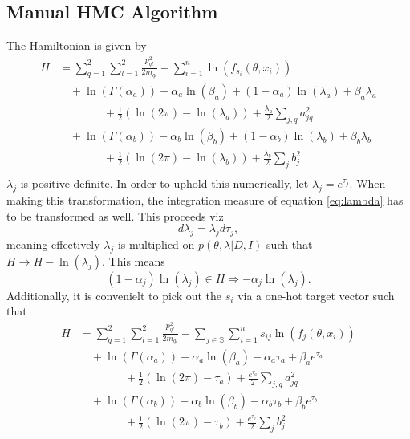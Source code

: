 \begin{example}
	\subsection{Manual HMC Algorithm}
	The Hamiltonian is given by
	\begin{equation}
		\begin{split}
			H&=\sum_{q=1}^{2}\sum_{l=1}^{2}\frac{p_{ql}^2}{2m_{ql}}-\sum_{i=1}^{n}\ln(f_{s_i}(\theta,x_i))\\
			&\quad+\ln(\Gamma(\alpha_a))-\alpha_a\ln(\beta_a)+(1-\alpha_a)\ln(\lambda_a)+\beta_a\lambda_a\\
			&\qquad \qquad+\frac{1}{2}(\ln(2\pi)-\ln(\lambda_a))+\frac{\lambda_a}{2}\sum_{j,q}a_{jq}^2\\
			&\quad+\ln(\Gamma(\alpha_b))-\alpha_b\ln(\beta_b)+(1-\alpha_b)\ln(\lambda_b)+\beta_b\lambda_b\\
			&\qquad \qquad+\frac{1}{2}(\ln(2\pi)-\ln(\lambda_b))+\frac{\lambda_b}{2}\sum_{j}b_j^2\\
		\end{split}
	\end{equation}
	$\lambda_j$ is positive definite. In order to uphold this numerically, let $\lambda_j = e^{\tau_j}$. When making this transformation, the integration measure of equation \eqref{eq:lambda} has to be transformed as well. This proceeds viz
	\begin{equation}
		d\lambda_j = \lambda_jd\tau_j,
	\end{equation}
	meaning effectively $\lambda_j$ is multiplied on $p(\theta,\lambda|D,I)$ such that $H \rightarrow H-\ln(\lambda_j)$. This means
	\begin{equation}
		(1-\alpha_j)\ln(\lambda_j)\in H \Rightarrow -\alpha_j \ln(\lambda_j).
	\end{equation}
	Additionally, it is convenielt to pick out the $s_i$ via a one-hot target vector such that
	\begin{equation}
		\begin{split}
			H&=\sum_{q=1}^{2}\sum_{l=1}^{2}\frac{p_{ql}^2}{2m_{ql}}-\sum_{j\in \mathbb{S}}\sum_{i=1}^{n}s_{ij}\ln(f_{j}(\theta,x_i))\\
			&\quad+\ln(\Gamma(\alpha_a))-\alpha_a\ln(\beta_a)-\alpha_a\tau_a+\beta_ae^{\tau_a}\\
			&\qquad \qquad+\frac{1}{2}(\ln(2\pi)-\tau_a)+\frac{e^{\tau_a}}{2}\sum_{j,q}a_{jq}^2\\
			&\quad+\ln(\Gamma(\alpha_b))-\alpha_b\ln(\beta_b)-\alpha_b\tau_b+\beta_be^{\tau_b}\\
			&\qquad \qquad+\frac{1}{2}(\ln(2\pi)-\tau_b)+\frac{e^{\tau_b}}{2}\sum_{j}b_j^2\\
		\end{split}
	\end{equation}
	

\end{example}
